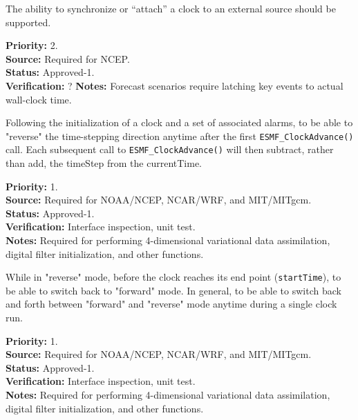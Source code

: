 The ability to synchronize or ``attach'' a clock to an external source should be supported.
\begin{reqlist}
{\bf Priority:} 2.\\
{\bf Source:} Required for NCEP. \\
{\bf Status:} Approved-1. \\
{\bf Verification:} ? 
{\bf Notes:} Forecast scenarios require latching key events to actual wall-clock time. 
\end{reqlist}

Following the initialization of a clock and a set of associated alarms, to be able to "reverse" the time-stepping direction anytime after the first {\tt ESMF\_ClockAdvance()} call.  Each subsequent call to {\tt ESMF\_ClockAdvance()} will then subtract, rather than add, the timeStep from the currentTime.
\begin{reqlist}
{\bf Priority:} 1. \\
{\bf Source:} Required for NOAA/NCEP, NCAR/WRF, and MIT/MITgcm. \\
{\bf Status:} Approved-1. \\
{\bf Verification:} Interface inspection, unit test. \\
{\bf Notes:} Required for performing 4-dimensional variational data assimilation, digital filter initialization, and other functions.
\end{reqlist}

While in "reverse" mode, before the clock reaches its end point ({\tt startTime}), to be able to switch back to "forward" mode.   In general, to be able to switch back and forth between "forward" and "reverse" mode anytime during a single clock run.
\begin{reqlist}
{\bf Priority:} 1. \\
{\bf Source:} Required for NOAA/NCEP, NCAR/WRF, and MIT/MITgcm. \\
{\bf Status:} Approved-1. \\
{\bf Verification:} Interface inspection, unit test. \\
{\bf Notes:} Required for performing 4-dimensional variational data assimilation, digital filter initialization, and other functions.
\end{reqlist}

